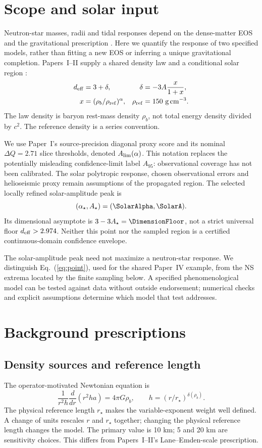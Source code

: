 \documentclass[twocolumn,prd,superscriptaddress,nofootinbib]{revtex4-2}
\begin{document}
\section{Scope and solar input}
Neutron-star masses, radii and tidal responses depend on the dense-matter
EOS and the gravitational prescription \cite{Lattimer2016,Oertel2017}.
Here we quantify the response of two specified models, rather than fitting
a new EOS or inferring a unique gravitational completion.
Papers~I--II supply a shared density law and a conditional solar region
\cite{PaperI,PaperII,WorkingEvidence}:
\begin{align}
 d_{\rm eff}&=3+\delta, &
 \delta&=-3A\frac{x}{1+x},\\
 x&=(\rho_b/\rho_{\rm ref})^\alpha, &
 \rho_{\rm ref}&=150~{\rm g\,cm^{-3}}.
\end{align}
The law density is baryon rest-mass density $\rho_b$, not total energy
density divided by $c^2$. The reference density is a series convention.

We use Paper~I's source-precision diagonal proxy score and its nominal
$\Delta Q=2.71$ slice thresholds, denoted $A_{\rm lim}(\alpha)$.
This notation replaces the potentially misleading confidence-limit label
$A_{95}$: observational coverage has not been calibrated. The solar
polytropic response, chosen observational errors and helioseismic proxy
remain assumptions of the propagated region. The selected locally refined
solar-amplitude peak is
\begin{equation}
 (\alpha_\star,A_\star)=(\SolarAlpha,\SolarA).
 \label{eq:point}
\end{equation}
Its dimensional asymptote is $3-3A_\star=\DimensionFloor$, not a strict
universal floor $d_{\rm eff}>2.974$. Neither this point nor the sampled
region is a certified continuous-domain confidence envelope.

The solar-amplitude peak need not maximize a neutron-star response.
We distinguish Eq.~(\ref{eq:point}), used for the shared Paper~IV example,
from the NS extrema located by the finite sampling below. A specified
phenomenological model can be tested against data without outside
endorsement; numerical checks and explicit assumptions determine which
model that test addresses.

\section{Background prescriptions}
\subsection{Density sources and reference length}
The operator-motivated Newtonian equation is
\begin{equation}
 \frac{1}{r^2h}\frac{d}{dr}(r^2h a)=4\pi G\rho_b,
 \qquad h=(r/r_\star)^{\delta(\rho_b)}.
\end{equation}
The physical reference length $r_\star$ makes the variable-exponent
weight well defined. A change of units rescales $r$ and $r_\star$
together; changing the physical reference length changes the model.
The primary value is 10 km; 5 and 20 km are sensitivity choices.
This differs from Papers~I--II's Lane--Emden-scale prescription.
\end{document}

